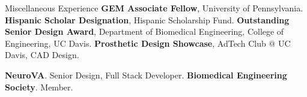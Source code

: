 \begin{rubric}{Miscellaneous Experience}
\entry*[2023] \textbf{GEM Associate Fellow}, University of Pennsylvania.
\entry*[2023] \textbf{Hispanic Scholar Designation}, Hispanic Scholarship Fund.
\entry*[2022] \textbf{Outstanding Senior Design Award}, Department of Biomedical Engineering, College of Engineering, UC Davis.
\entry*[2021] \textbf{Prosthetic Design Showcase}, AdTech Club @ UC Davis, CAD Design.
%

\entry*[2021 -- 2022] \textbf{NeuroVA}. Senior Design, Full Stack Developer.
\entry*[2020 -- 2022] \textbf{Biomedical Engineering Society}. Member.
\end{rubric}